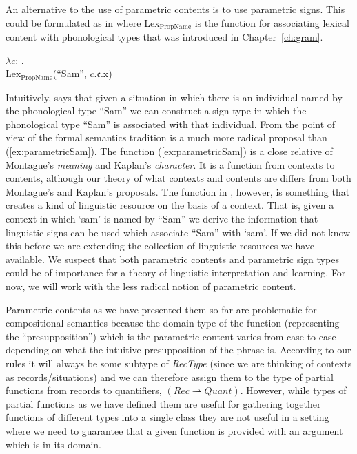 An alternative to the use of parametric contents is to use parametric
signs.  This could be formulated as in \nexteg{} where
Lex$_{\mathrm{PropName}}$ is the function for associating lexical
content with phonological types that was introduced in
Chapter~\ref{ch:gram}.
\begin{ex} 
  $\lambda c$: . \\
\hspace*{5em}Lex$_{\mathrm{PropName}}$(``Sam'', $c.\mathfrak{c}$.x) 
\end{ex} 
Intuitively, \preveg{} says that given a situation in which there is
an individual named by the phonological type ``Sam'' we can construct
a sign type in which the phonological type ``Sam'' is associated with
that individual.  From the point of view of the formal semantics
tradition \preveg{} is a much more radical proposal than
(\ref{ex:parametricSam}).  The function (\ref{ex:parametricSam}) is a
close relative of Montague's \textit{meaning} and Kaplan's \textit{character}.
It is a function from contexts to contents, although our theory of
what contexts and contents are differs from both Montague's and
Kaplan's proposals.  The function in \preveg{}, however, is something
that creates a kind of linguistic resource on the basis of a context.
That is, given a context in which `sam' is named by ``Sam'' we derive
the information that linguistic signs can be used which associate
``Sam'' with `sam'.  If we did not know this before we are extending
the collection of linguistic resources we have available.  We suspect
that both parametric contents and parametric sign types could be of
importance for a theory of linguistic interpretation and learning.
For now, we will work with the less radical notion of parametric
content.  

Parametric contents as we have presented them so far are problematic
for compositional semantics because the domain type of the
function (representing the ``presupposition'') which is the parametric
content varies from case to case depending on what the intuitive
presupposition of the phrase is.  According to our rules it will
always be some subtype of \textit{RecType} (since we are thinking of
contexts as records/situations) and we can therefore assign them to
the type of partial functions from records to quantifiers,
$(\textit{Rec}\rightharpoonup\textit{Quant})$. However, while types of
partial functions as we have defined them are useful for gathering together functions of
different types into a single class they are not useful in a setting
where we need to guarantee that a given function is provided with an
argument which is in its domain.

